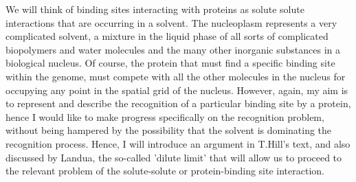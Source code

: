   We will think of binding sites interacting with proteins as solute solute interactions that are occurring in a solvent.  The nucleoplasm represents a very complicated solvent, a mixture in the liquid phase of all sorts of complicated biopolymers and water molecules and the many other inorganic substances in a biological nucleus.  Of course, the protein that must find a specific binding site within the genome, must compete with all the other molecules in the nucleus for occupying any point in the spatial grid of the nucleus.  However, again, my aim is to represent and describe the recognition of a particular binding site by a protein, hence I would like to make progress specifically on the recognition problem, without being hampered by the possibility that the solvent is dominating the recognition process.  Hence, I will introduce an argument in T.Hill's text\cite{hill}, and also discussed by Landua\cite{landaumech}, the so-called 'dilute limit' that will allow us to proceed to the relevant problem of the solute-solute or protein-binding site interaction.
 
